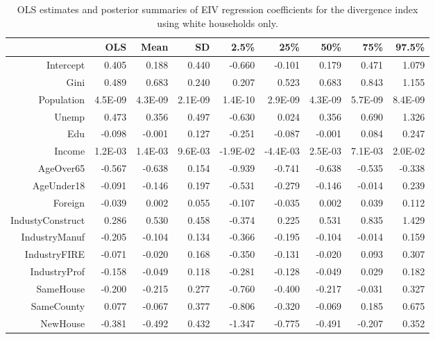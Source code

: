 \documentclass[12pt]{article}
\begin{document}
\begin{table}[ht]
\centering
\begin{tabular}{rrrrrrrrr}
  \hline
 & OLS & Mean & SD & 2.5\% & 25\% & 50\% & 75\% & 97.5\% \\ 
  \hline
Intercept & 0.405 & 0.188 & 0.440 & -0.660 & -0.101 & 0.179 & 0.471 & 1.079 \\ 
  Gini & 0.489 & 0.683 & 0.240 & 0.207 & 0.523 & 0.683 & 0.843 & 1.155 \\ 
  Population & 4.5E-09 & 4.3E-09 & 2.1E-09 & 1.4E-10 & 2.9E-09 & 4.3E-09 & 5.7E-09 & 8.4E-09 \\ 
  Unemp & 0.473 & 0.356 & 0.497 & -0.630 & 0.024 & 0.356 & 0.690 & 1.326 \\ 
  Edu & -0.098 & -0.001 & 0.127 & -0.251 & -0.087 & -0.001 & 0.084 & 0.247 \\ 
  Income & 1.2E-03 & 1.4E-03 & 9.6E-03 & -1.9E-02 & -4.4E-03 & 2.5E-03 & 7.1E-03 & 2.0E-02 \\ 
  AgeOver65 & -0.567 & -0.638 & 0.154 & -0.939 & -0.741 & -0.638 & -0.535 & -0.338 \\ 
  AgeUnder18 & -0.091 & -0.146 & 0.197 & -0.531 & -0.279 & -0.146 & -0.014 & 0.239 \\ 
  Foreign & -0.039 & 0.002 & 0.055 & -0.107 & -0.035 & 0.002 & 0.039 & 0.112 \\ 
  IndustyConstruct & 0.286 & 0.530 & 0.458 & -0.374 & 0.225 & 0.531 & 0.835 & 1.429 \\ 
  IndustryManuf & -0.205 & -0.104 & 0.134 & -0.366 & -0.195 & -0.104 & -0.014 & 0.159 \\ 
  IndustryFIRE & -0.071 & -0.020 & 0.168 & -0.350 & -0.131 & -0.020 & 0.093 & 0.307 \\ 
  IndustryProf & -0.158 & -0.049 & 0.118 & -0.281 & -0.128 & -0.049 & 0.029 & 0.182 \\ 
  SameHouse & -0.200 & -0.215 & 0.277 & -0.760 & -0.400 & -0.217 & -0.031 & 0.327 \\ 
  SameCounty & 0.077 & -0.067 & 0.377 & -0.806 & -0.320 & -0.069 & 0.185 & 0.675 \\ 
  NewHouse & -0.381 & -0.492 & 0.432 & -1.347 & -0.775 & -0.491 & -0.207 & 0.352 \\ 
   \hline
\end{tabular}
\caption{OLS estimates and posterior summaries of EIV regression coefficients for the divergence index using white households only.}
\label{tab:eiv.kl.raw.white}
\end{table}
\end{document}
